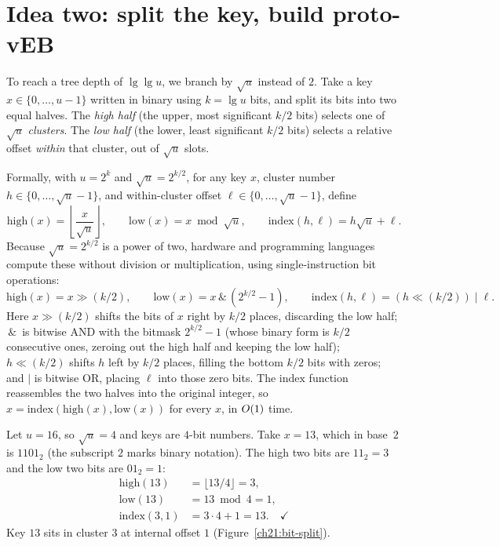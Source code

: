 \section{Idea two: split the key, build proto-vEB}

To reach a tree depth of $\lg\lg u$, we branch by $\sqrt{u}$ instead of $2$. Take a key
$x \in \{0,\dots,u-1\}$ written in binary using $k = \lg u$ bits, and split its bits
into two equal halves. The \emph{high half} (the upper, most significant
$k/2$ bits) selects one of $\sqrt{u}$ \emph{clusters}. The
\emph{low half} (the lower, least significant $k/2$ bits) selects a relative offset \emph{within} that
cluster, out of $\sqrt{u}$ slots.

Formally, with $u = 2^k$ and $\sqrt{u} = 2^{k/2}$, for any key $x$, cluster number $h \in \{0,\dots,\sqrt{u}-1\}$, and within-cluster offset $\ell \in \{0,\dots,\sqrt{u}-1\}$, define
\[
  \mathrm{high}(x) = \left\lfloor \frac{x}{\sqrt{u}} \right\rfloor,
  \qquad
  \mathrm{low}(x) = x \bmod \sqrt{u},
  \qquad
  \mathrm{index}(h,\ell) = h\sqrt{u} + \ell .
\]
Because $\sqrt{u} = 2^{k/2}$ is a power of two, hardware and programming languages compute these without division or multiplication, using single-instruction bit operations:
\[
  \mathrm{high}(x) = x \gg (k/2), \qquad
  \mathrm{low}(x) = x \,\&\, (2^{k/2} - 1), \qquad
  \mathrm{index}(h, \ell) = (h \ll (k/2)) \mid \ell .
\]
Here $x \gg (k/2)$ shifts the bits of $x$ right by $k/2$ places, discarding the low half; $\,\&\,$ is bitwise AND with the bitmask $2^{k/2} - 1$ (whose binary form is $k/2$ consecutive ones, zeroing out the high half and keeping the low half); $h \ll (k/2)$ shifts $h$ left by $k/2$ places, filling the bottom $k/2$ bits with zeros; and $\mid$ is bitwise OR, placing $\ell$ into those zero bits.
The $\mathrm{index}$ function reassembles the two halves into the original
integer, so $x = \mathrm{index}(\mathrm{high}(x), \mathrm{low}(x))$ for every $x$, in $O(1)$ time.

\begin{example}
Let $u = 16$, so $\sqrt{u} = 4$ and keys are $4$-bit numbers. Take $x = 13$,
which in base~$2$ is $1101_2$ (the subscript $2$ marks binary notation). The high two bits are $11_2 = 3$ and the low two bits
are $01_2 = 1$:
\begin{align*}
  \mathrm{high}(13) &= \lfloor 13/4 \rfloor = 3, \\
  \mathrm{low}(13) &= 13 \bmod 4 = 1, \\
  \mathrm{index}(3,1) &= 3\cdot 4 + 1 = 13. \quad\checkmark
\end{align*}
Key $13$ sits in cluster $3$ at internal offset $1$ (Figure~\ref{ch21:bit-split}).
\end{example}

